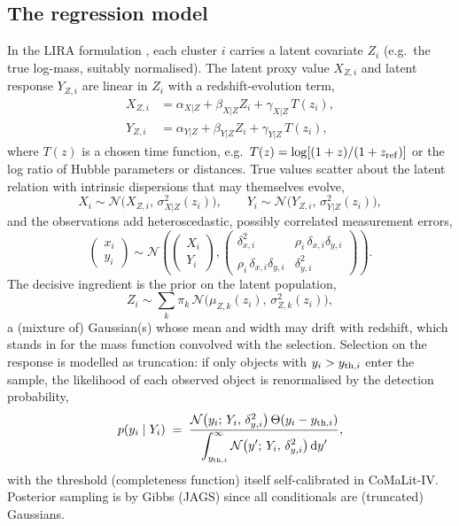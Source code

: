 \documentclass[11pt,a4paper]{article}
\newcommand{\dd}{\mathrm{d}}
\begin{document}
\subsection{The regression model}
\label{sec:lira}

In the LIRA formulation \cite{lira,comalit4}, each cluster $i$ carries a
latent covariate $Z_i$ (e.g.\ the true log-mass, suitably normalised). The
latent proxy value $X_{Z,i}$ and latent response $Y_{Z,i}$ are linear in
$Z_i$ with a redshift-evolution term,
\begin{align}
X_{Z,i} &= \alpha_{X|Z} + \beta_{X|Z} Z_i + \gamma_{X|Z}\, T(z_i),
\label{eq:lira-x}\\
Y_{Z,i} &= \alpha_{Y|Z} + \beta_{Y|Z} Z_i + \gamma_{Y|Z}\, T(z_i),
\label{eq:lira-y}
\end{align}
where $T(z)$ is a chosen time function, e.g.\
$T(z)=\log\!\left[(1+z)/(1+z_{\rm ref})\right]$ or the log ratio of Hubble
parameters or distances. True values scatter about the latent relation with
intrinsic dispersions that may themselves evolve,
\begin{equation}
X_i \sim \mathcal{N}\!\big(X_{Z,i},\, \sigma_{X|Z}^2(z_i)\big),
\qquad
Y_i \sim \mathcal{N}\!\big(Y_{Z,i},\, \sigma_{Y|Z}^2(z_i)\big),
\label{eq:lira-scatter}
\end{equation}
and the observations add heteroscedastic, possibly correlated measurement
errors,
\begin{equation}
\begin{pmatrix} x_i \\ y_i \end{pmatrix}
\sim
\mathcal{N}\!\left(
\begin{pmatrix} X_i \\ Y_i \end{pmatrix},
\begin{pmatrix}
\delta_{x,i}^2 & \rho_i\,\delta_{x,i}\delta_{y,i}\\
\rho_i\,\delta_{x,i}\delta_{y,i} & \delta_{y,i}^2
\end{pmatrix}
\right).
\label{eq:lira-meas}
\end{equation}
The decisive ingredient is the prior on the latent population,
\begin{equation}
Z_i \sim \sum_k \pi_k\,
\mathcal{N}\!\big(\mu_{Z,k}(z_i),\, \sigma_{Z,k}^2(z_i)\big),
\label{eq:lira-pop}
\end{equation}
a (mixture of) Gaussian(s) whose mean and width may drift with redshift,
which stands in for the mass function convolved with the selection.
Selection on the response is modelled as truncation: if only objects with
$y_i > y_{{\rm th},i}$ enter the sample, the likelihood of each observed
object is renormalised by the detection probability,
\begin{equation}
p(y_i \mid Y_i) \;=\;
\frac{\mathcal{N}\big(y_i;\, Y_i,\, \delta_{y,i}^2\big)\,
\Theta(y_i - y_{{\rm th},i})}
{\displaystyle \int_{y_{{\rm th},i}}^{\infty}
\mathcal{N}\big(y';\, Y_i,\, \delta_{y,i}^2\big)\,\dd y'},
\label{eq:lira-malmquist}
\end{equation}
with the threshold (completeness function) itself self-calibrated in
CoMaLit-IV. Posterior sampling is by Gibbs (JAGS) since all conditionals
are (truncated) Gaussians.
\end{document}
